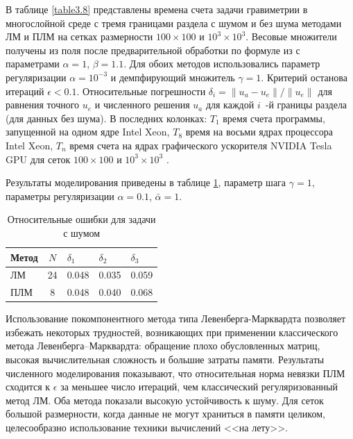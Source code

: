 В таблице \ref{table3.8} представлены времена счета задачи гравиметрии в многослойной среде с тремя границами раздела с шумом и без шума методами ЛМ и ПЛМ на сетках размерности $100\times100$ и $10^3\times10^3$. Весовые множители получены из поля после предварительной обработки по формуле из  \cite{AkMarMis2013} с параметрами $\alpha=1$, $\beta=1.1$.  Для обоих методов использовались параметр регуляризации $\alpha=10^{-3}$ и демпфирующий множитель $\gamma=1$. Критерий останова итераций $\epsilon < 0.1$. Относительные погрешности $\delta_i=\|u_a-u_e\|/\|u_e\|$ для равнения точного $u_e$ и численного решения $u_a$ для каждой $i$~-й границы раздела (для данных без шума). В последних колонках: $T_1 $ время счета программы, запущенной на одном ядре Intel Xeon, $T_8$ время на восьми ядрах процессора Intel Xeon, $T_n$ время счета на ядрах графического ускорителя NVIDIA Tesla GPU для сеток $100\times100$ и $10^3\times10^3$ . 

Результаты моделирования приведены в таблице \ref{table3.9}, параметр шага $\gamma=1$, параметры регуляризации $\alpha=0.1$, $\bar{\alpha}=1$.
\begin{table}[]
	\centering
	\caption{Относительные ошибки для задачи с шумом}
	\label{table3.9}
	\begin{tabular}{|l|c|l|l|l|}
		\hline
		\textbf{Метод} & \textbf{$N$} & \textbf{$\delta_1$} & \textbf{$\delta_2$} & \textbf{$\delta_3$} \\ \hline
		ЛМ                                                    & 24                            & 0.048                                & 0.035                                & 0.059                                \\ \hline
		ПЛМ                                                   & 8                             & 0.048                                & 0.040                                & 0.068                                \\ \hline
	\end{tabular}
\end{table}

Использование покомпонентного метода типа Левенберга-Марквардта позволяет избежать некоторых трудностей, возникающих при применении классического метода Левенберга--Марквардта: обращение плохо обусловленных матриц, высокая вычислительная сложность и большие затраты памяти. Результаты численного моделирования показывают, что относительная норма невязки ПЛМ сходится к $\epsilon$ за меньшее число итераций, чем классический регуляризованный метод ЛМ. Оба метода показали высокую устойчивость к шуму. Для сеток большой размерности, когда данные не могут храниться в памяти целиком, целесообразно использование техники вычислений <<на лету>>.